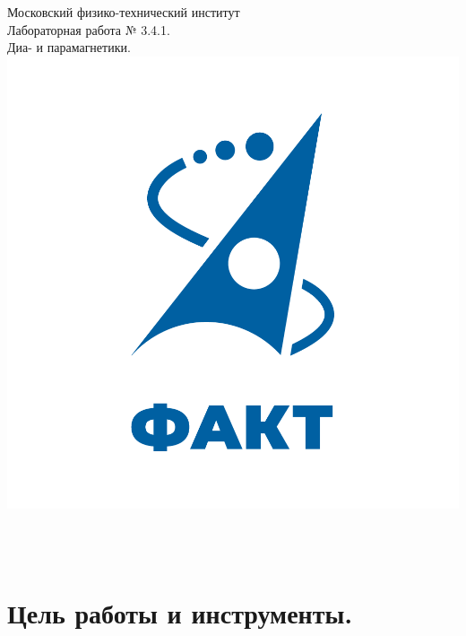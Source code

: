 \documentclass[a4paper,12pt]{article} %
\begin{document}

\begin{titlepage}
\begin{center}
	\large{Московский физико-технический институт}\\
	\vspace{100px}
	\LARGE{Лабораторная работа № 3.4.1.}\\
	\LARGE{Диа- и парамагнетики.}\\
	\vspace{30px}
	\includegraphics[scale = 0.3]{fakt_logo.png}\\
\end{center}

\vfill
\begin{flushright}
	\\
	\\
\end{flushright}
\end{titlepage}

\newpage

\tableofcontents

\newpage

\section{Цель работы и инструменты.}
\end{document}
